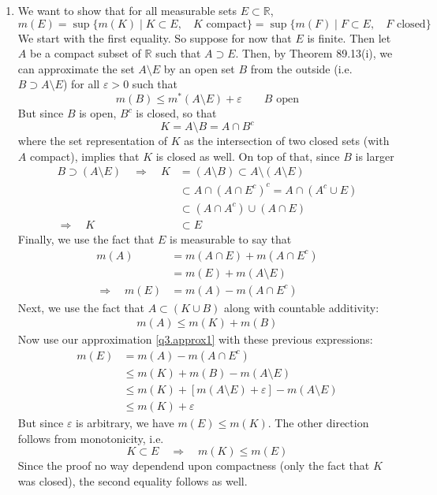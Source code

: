 \documentclass[12pt]{article}
\theoremstyle{plain}
\theoremstyle{definition}
\theoremstyle{remark}
\begin{document}
\begin{enumerate}
\item We want to show that for all measurable sets $E\subset \mathbb{R}$, 
\[
    m(E) = \sup \{ m(K) \; | \; K \subset E, \; 
    \text{ $K$ compact}\}  
    = \sup \{ m(F) \; | \; F \subset E, \; 
    \text{ $F$ closed}\}  
\]
We start with the first equality. So suppose for now that $E$ is finite. Then let $A$ be a compact subset of $\mathbb{R}$ such that $A \supset E$. Then, by Theorem 89.13(i), we can approximate the set $A\setminus E$ by an open set $B$ from the outside (i.e. $B\supset A\setminus E$) for all $\varepsilon>0$ such that
\begin{equation}
    \label{q3.approx1}
    m(B) \leq m^*(A\setminus E) + \varepsilon
    \qquad \text{$B$ open}
\end{equation}
But since $B$ is open, $B^c$ is closed, so that 
\[
    K = A \setminus B = A \cap B^c 
\]
where the set representation of $K$ as the intersection of two closed sets (with $A$ compact), implies that $K$ is closed as well. On top of that, since $B$ is larger
\begin{align*}
    B \supset (A\setminus E) 
    \quad \Rightarrow\quad
    K &= (A\setminus B) \subset A\setminus (A\setminus E) \\
    &\subset A\cap (A \cap E^c)^c = A\cap (A^c \cup E)  \\
    &\subset (A \cap A^c) \cup (A\cap E)\\
    \Rightarrow\quad
    K &\subset E
\end{align*}
Finally, we use the fact that $E$ is measurable to say that
\begin{align*}
    m(A) &= m(A \cap E) + m(A \cap E^c) \\
        &= m(E) + m(A\setminus E ) \\
    \Rightarrow \quad
    m(E) &= m(A) - m(A \cap E^c) 
\end{align*}
Next, we use the fact that $A \subset (K\cup B)$ along with countable additivity:
\begin{align*}
    m(A) \leq m(K) + m(B)
\end{align*}
Now use our approximation \ref{q3.approx1} with these previous expressions:
\begin{align*}
    m(E) &= m(A) - m(A\cap E^c)  \\
    &\leq m(K) + m(B) - m(A\setminus E)\\
    &\leq m(K) + [m(A \setminus E)+\varepsilon] - m(A\setminus E)\\
    &\leq m(K) + \varepsilon
\end{align*}
But since $\varepsilon$ is arbitrary, we have $m(E) \leq m(K)$. The other direction follows from monotonicity, i.e.
\[
    K \subset E 
    \quad \Rightarrow \quad
    m(K) \leq m(E)
\]
Since the proof no way dependend upon compactness (only the fact that $K$ was closed), the second equality follows as well.



\end{enumerate}
\end{document}

